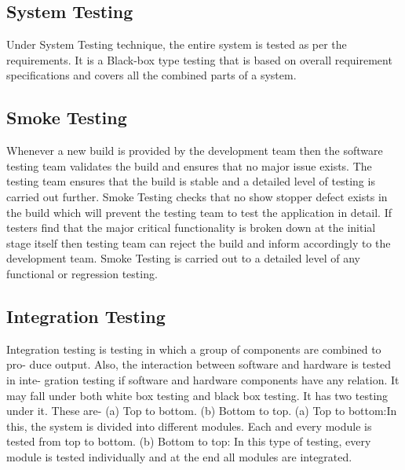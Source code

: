 \documentclass[oneside,a4paper,12pt]{report}
\begin{document}
{\subsection{System Testing}
Under System Testing technique, the entire system is tested as per the requirements. It is a Black-box type testing that is based on overall requirement specifications and covers all the combined parts of a system.
\subsection{Smoke Testing}
Whenever a new build is provided by the development team then the software testing team validates the build and ensures that no major issue exists. The testing team ensures that the build is stable and a detailed level of testing is carried out further. Smoke Testing checks that no show stopper defect exists in the build which will prevent the testing team to test the application in detail. If testers find that the major critical functionality is broken down at the initial stage itself then testing team can reject the build and inform accordingly to the development team. Smoke Testing is carried out to a detailed level of any functional or regression testing.
\subsection{Integration Testing}
Integration testing is testing in which a group of components are combined to pro- duce output. Also, the interaction between software and hardware is tested in inte- gration testing if software and hardware components have any relation. It may fall under both white box testing and black box testing. It has two testing under it. These are- (a) Top to bottom. (b) Bottom to top.
(a)	Top to bottom:In this, the system is divided into different modules. Each and every module is tested from top to bottom.
(b)	Bottom to top: In this type of testing, every module is tested individually and at the end all modules are integrated.

}
\end{document}

